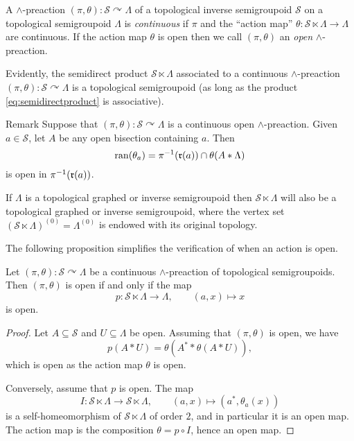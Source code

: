 \begin{definition}
    A $\land$-preaction $(\pi,\theta)\colon\mathcal{S}\curvearrowright\Lambda$ of a topological inverse semigroupoid $\mathcal{S}$ on a topological semigroupoid $\Lambda$ is \emph{continuous} if $\pi$ and the ``action map'' $\theta\colon\mathcal{S}\ltimes\Lambda\to\Lambda$ are continuous. If the action map $\theta$ is open then we call $(\pi,\theta)$ an \emph{open} $\land$-preaction.
\end{definition}

Evidently, the semidirect product $\mathcal{S}\ltimes\Lambda$ associated to a continuous $\land$-preaction $(\pi,\theta)\colon\mathcal{S}\curvearrowright\Lambda$ is a topological semigroupoid (as long as the product \eqref{eq:semidirectproduct} is associative).

\begin{denv*}{Remark}
Suppose that $(\pi,\theta)\colon\mathcal{S}\curvearrowright\Lambda$ is a continuous open $\land$-preaction. Given $a\in\mathcal{S}$, let $A$ be any open bisection containing $a$. Then \[\operatorname{ran}(\theta_a)=\pi^{-1}(\operatorname{\mathfrak{r}}(a))\cap\theta(A\ast\Lambda)\]
is open in $\pi^{-1}(\operatorname{\mathfrak{r}}(a))$.
\end{denv*}

If $\Lambda$ is a topological graphed or inverse semigroupoid then $\mathcal{S}\ltimes\Lambda$ will also be a topological graphed or inverse semigroupoid, where the vertex set $(\mathcal{S}\ltimes\Lambda)^{(0)}=\Lambda^{(0)}$ is endowed with its original topology.

The following proposition simplifies the verification of when an action is open.

\begin{proposition}\label{prop:preactionisopeniffprojectionisopen}
Let $(\pi,\theta)\colon\mathcal{S}\curvearrowright\Lambda$ be a continuous $\land$-preaction of topological semigroupoids. Then $(\pi,\theta)$ is open if and only if the map
\[p\colon\mathcal{S}\ltimes\Lambda\to\Lambda,\qquad(a,x)\mapsto x\]
is open.
\end{proposition}
\begin{proof}
Let $A\subseteq\mathcal{S}$ and $U\subseteq\Lambda$ be open. Assuming that $(\pi,\theta)$ is open, we have
\[p(A\ast U)=\theta(A^*\ast\theta(A\ast U)),\]
which is open as the action map $\theta$ is open.

Conversely, assume that $p$ is open. The map \[I\colon\mathcal{S}\ltimes\Lambda\to\mathcal{S}\ltimes\Lambda,\qquad (a,x)\mapsto (a^*,\theta_a(x))\]
is a self-homeomorphism of $\mathcal{S}\ltimes\Lambda$ of order $2$, and in particular it is an open map. The action map is the composition $\theta=p\circ I$, hence an open map.
\end{proof}

